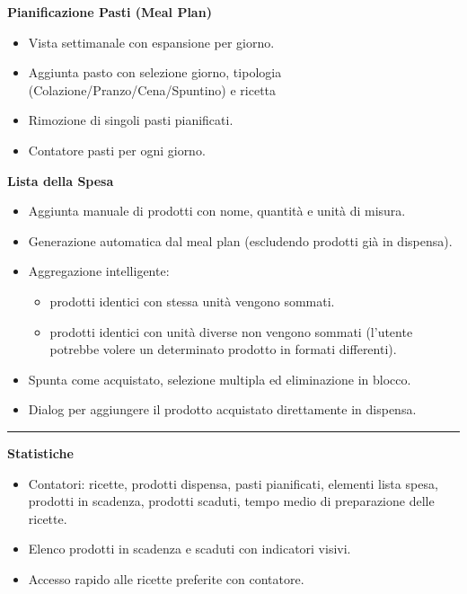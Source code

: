 \documentclass[a4paper, 12pt]{article}
\begin{document}
{\color{ForestGreen}\raggedright{\large \textbf{Pianificazione Pasti (Meal Plan)}}}
\begin{itemize}
    \item Vista settimanale con espansione per giorno.
    \item Aggiunta pasto con selezione giorno, tipologia (Colazione/Pranzo/Cena/Spuntino) e ricetta
    \item Rimozione di singoli pasti pianificati.
    \item Contatore pasti per ogni giorno.
\end{itemize}

\newpage

{\color{ForestGreen}\raggedright{\large \textbf{Lista della Spesa}}}
\begin{itemize}
    \item Aggiunta manuale di prodotti con nome, quantità e unità di misura.
    \item Generazione automatica dal meal plan (escludendo prodotti già in dispensa).
    \item Aggregazione intelligente:
    \begin{itemize}[label=•]
        \item prodotti identici con stessa unità vengono sommati.
        \item prodotti identici con unità diverse non vengono sommati (l’utente potrebbe volere un determinato prodotto in formati differenti).
    \end{itemize}

    \item Spunta come acquistato, selezione multipla ed eliminazione in blocco.
    \item Dialog per aggiungere il prodotto acquistato direttamente in dispensa.
\end{itemize}

\vspace{0.5 cm}
\hrule
\vspace{0.5 cm}

{\color{ForestGreen}\raggedright{\large \textbf{Statistiche}}}
\begin{itemize}
    \item Contatori: ricette, prodotti dispensa, pasti pianificati, elementi lista spesa, prodotti in scadenza, prodotti scaduti, tempo medio di preparazione delle ricette.
    \item Elenco prodotti in scadenza e scaduti con indicatori visivi.
    \item Accesso rapido alle ricette preferite con contatore.
\end{itemize}
\end{document}
